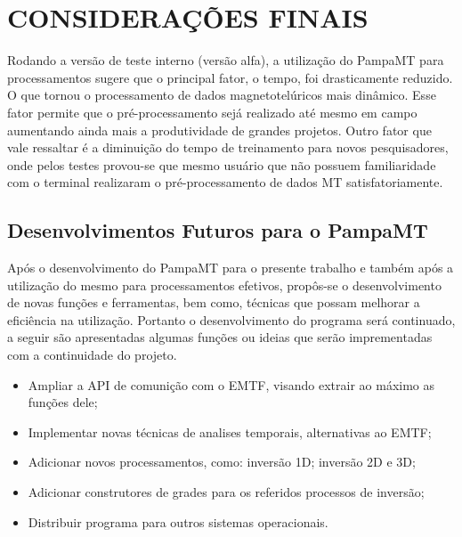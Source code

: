 \chapter{CONSIDERAÇÕES FINAIS}
    
    Rodando a versão de teste interno (versão alfa), a utilização do PampaMT para processamentos sugere que o principal fator, o tempo, foi drasticamente reduzido. O que tornou o processamento de dados magnetotelúricos mais dinâmico. Esse fator permite que o pré-processamento sejá realizado até mesmo em campo aumentando ainda mais a produtividade de grandes projetos. Outro fator que vale ressaltar é a diminuição do tempo de treinamento para novos pesquisadores, onde pelos testes provou-se que mesmo usuário que não possuem familiaridade com o terminal realizaram o pré-processamento de dados MT  satisfatoriamente.     
    
    \section{Desenvolvimentos Futuros para o PampaMT}
        
        Após o desenvolvimento do PampaMT para o presente trabalho e também após a utilização do mesmo para processamentos efetivos, propôs-se o desenvolvimento de novas funções e ferramentas, bem como, técnicas que possam melhorar a eficiência na utilização. Portanto o desenvolvimento do programa será continuado, a seguir são apresentadas algumas funções ou ideias que serão imprementadas com a continuidade do projeto.
        
        \begin{itemize}
         \item Ampliar a API de comunição com o EMTF, visando extrair ao máximo as funções dele;
         \item Implementar novas técnicas de analises temporais, alternativas ao EMTF;
         \item Adicionar novos processamentos, como: inversão 1D; inversão 2D e 3D;
         \item Adicionar construtores de grades para os referidos processos de inversão;
         \item Distribuir programa para outros sistemas operacionais.
        \end{itemize}
